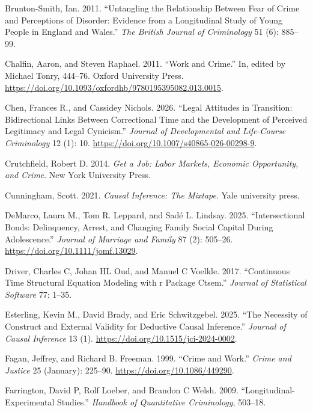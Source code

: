 \documentclass[
  letterpaper,
  DIV=11,
  numbers=noendperiod]{scrartcl}
\newlength{\cslhangindent}
\newenvironment{CSLReferences}[2] %
 {\begin{list}{}{%
  \setlength{\itemindent}{0pt}
  \setlength{\leftmargin}{0pt}
  \setlength{\parsep}{0pt}
  \ifodd #1
   \setlength{\leftmargin}{\cslhangindent}
   \setlength{\itemindent}{-1\cslhangindent}
  \fi
  \setlength{\itemsep}{#2\baselineskip}}}
 {\end{list}}
\begin{document}
\begin{CSLReferences}{1}{0}
Brunton-Smith, Ian. 2011. {``Untangling the Relationship Between Fear of
Crime and Perceptions of Disorder: Evidence from a Longitudinal Study of
Young People in {E}ngland and {W}ales.''} \emph{The British Journal of
Criminology} 51 (6): 885--99.

Chalfin, Aaron, and Steven Raphael. 2011. {``Work and Crime.''} In,
edited by Michael Tonry, 444--76. Oxford University Press.
\url{https://doi.org/10.1093/oxfordhb/9780195395082.013.0015}.

Chen, Frances R., and Cassidey Nichols. 2026. {``Legal Attitudes in
Transition: Bidirectional Links Between Correctional Time and the
Development of Perceived Legitimacy and Legal Cynicism.''} \emph{Journal
of Developmental and Life-Course Criminology} 12 (1): 10.
\url{https://doi.org/10.1007/s40865-026-00298-9}.

Crutchfield, Robert D. 2014. \emph{Get a Job: Labor Markets, Economic
Opportunity, and Crime}. New York University Press.

Cunningham, Scott. 2021. \emph{Causal Inference: The Mixtape}. Yale
university press.

DeMarco, Laura M., Tom R. Leppard, and Sadé L. Lindsay. 2025.
{``Intersectional Bonds: Delinquency, Arrest, and Changing Family Social
Capital During Adolescence.''} \emph{Journal of Marriage and Family} 87
(2): 505--26. \url{https://doi.org/10.1111/jomf.13029}.

Driver, Charles C, Johan HL Oud, and Manuel C Voelkle. 2017.
{``Continuous Time Structural Equation Modeling with r Package Ctsem.''}
\emph{Journal of Statistical Software} 77: 1--35.

Esterling, Kevin M., David Brady, and Eric Schwitzgebel. 2025. {``The
Necessity of Construct and External Validity for Deductive Causal
Inference.''} \emph{Journal of Causal Inference} 13 (1).
\url{https://doi.org/10.1515/jci-2024-0002}.

Fagan, Jeffrey, and Richard B. Freeman. 1999. {``Crime and Work.''}
\emph{Crime and Justice} 25 (January): 225--90.
\url{https://doi.org/10.1086/449290}.

Farrington, David P, Rolf Loeber, and Brandon C Welsh. 2009.
{``Longitudinal-Experimental Studies.''} \emph{Handbook of Quantitative
Criminology}, 503--18.


\end{CSLReferences}
\end{document}
